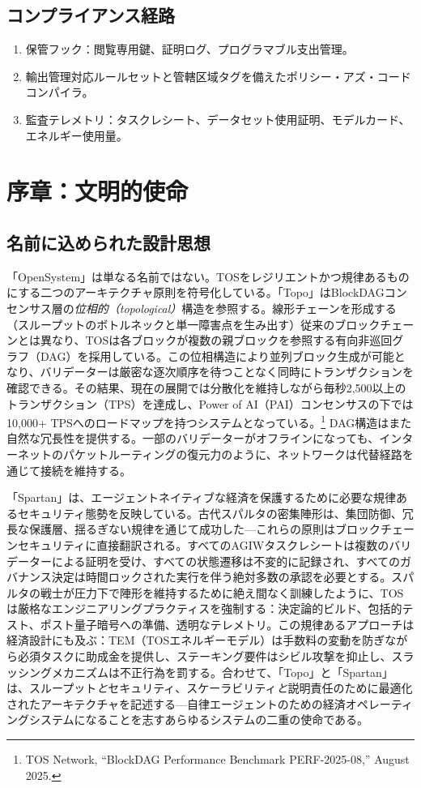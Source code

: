\documentclass[11pt]{article}
\begin{document}
\subsection{コンプライアンス経路}
\begin{enumerate}[noitemsep]
  \item 保管フック：閲覧専用鍵、証明ログ、プログラマブル支出管理。
  \item 輸出管理対応ルールセットと管轄区域タグを備えたポリシー・アズ・コードコンパイラ。
  \item 監査テレメトリ：タスクレシート、データセット使用証明、モデルカード、エネルギー使用量。
\end{enumerate}

\section{序章：文明的使命}
\subsection{名前に込められた設計思想}
「OpenSystem」は単なる名前ではない。TOSをレジリエントかつ規律あるものにする二つのアーキテクチャ原則を符号化している。「Topo」はBlockDAGコンセンサス層の\emph{位相的（topological）}構造を参照する。線形チェーンを形成する（スループットのボトルネックと単一障害点を生み出す）従来のブロックチェーンとは異なり、TOSは各ブロックが複数の親ブロックを参照する有向非巡回グラフ（DAG）を採用している。この位相構造により並列ブロック生成が可能となり、バリデーターは厳密な逐次順序を待つことなく同時にトランザクションを確認できる。その結果、現在の展開では分散化を維持しながら毎秒2,500以上のトランザクション（TPS）を達成し、Power of AI（PAI）コンセンサスの下では10,000+ TPSへのロードマップを持つシステムとなっている。\footnote{TOS Network, ``BlockDAG Performance Benchmark PERF-2025-08,'' August 2025.} DAG構造はまた自然な冗長性を提供する。一部のバリデーターがオフラインになっても、インターネットのパケットルーティングの復元力のように、ネットワークは代替経路を通じて接続を維持する。

「Spartan」は、エージェントネイティブな経済を保護するために必要な規律あるセキュリティ態勢を反映している。古代スパルタの密集陣形は、集団防御、冗長な保護層、揺るぎない規律を通じて成功した---これらの原則はブロックチェーンセキュリティに直接翻訳される。すべてのAGIWタスクレシートは複数のバリデーターによる証明を受け、すべての状態遷移は不変的に記録され、すべてのガバナンス決定は時間ロックされた実行を伴う絶対多数の承認を必要とする。スパルタの戦士が圧力下で陣形を維持するために絶え間なく訓練したように、TOSは厳格なエンジニアリングプラクティスを強制する：決定論的ビルド、包括的テスト、ポスト量子暗号への準備、透明なテレメトリ。この規律あるアプローチは経済設計にも及ぶ：TEM（TOSエネルギーモデル）は手数料の変動を防ぎながら必須タスクに助成金を提供し、ステーキング要件はシビル攻撃を抑止し、スラッシングメカニズムは不正行為を罰する。合わせて、「Topo」と「Spartan」は、スループット\emph{と}セキュリティ、スケーラビリティ\emph{と}説明責任のために最適化されたアーキテクチャを記述する---自律エージェントのための経済オペレーティングシステムになることを志すあらゆるシステムの二重の使命である。
\end{document}
